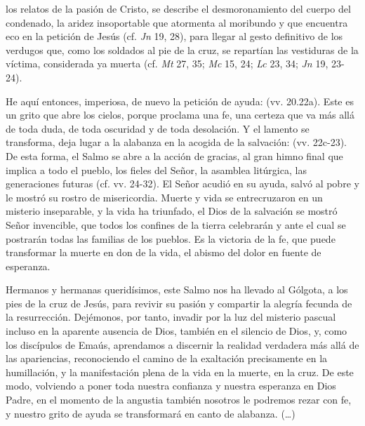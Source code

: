\begin{body}
los relatos de la pasión de Cristo, se describe el desmoronamiento del cuerpo del condenado, la aridez insoportable que atormenta al moribundo y que encuentra eco en la petición de Jesús  (cf. \emph{Jn} 19, 28), para llegar al gesto definitivo de los verdugos que, como los soldados al pie de la cruz, se repartían las vestiduras de la víctima, considerada ya muerta (cf. \emph{Mt} 27, 35; \emph{Mc} 15, 24; \emph{Lc} 23, 34; \emph{Jn} 19, 23-24). 

He aquí entonces, imperiosa, de nuevo la petición de ayuda:  (vv. 20.22a). Este es un grito que abre los cielos, porque proclama una fe, una certeza que va más allá de toda duda, de toda oscuridad y de toda desolación. Y el lamento se transforma, deja lugar a la alabanza en la acogida de la salvación:  (vv. 22c-23). De esta forma, el Salmo se abre a la acción de gracias, al gran himno final que implica a todo el pueblo, los fieles del Señor, la asamblea litúrgica, las generaciones futuras (cf. vv. 24-32). El Señor acudió en su ayuda, salvó al pobre y le mostró su rostro de misericordia. Muerte y vida se entrecruzaron en un misterio inseparable, y la vida ha triunfado, el Dios de la salvación se mostró Señor invencible, que todos los confines de la tierra celebrarán y ante el cual se postrarán todas las familias de los pueblos. Es la victoria de la fe, que puede transformar la muerte en don de la vida, el abismo del dolor en fuente de esperanza. 

Hermanos y hermanas queridísimos, este Salmo nos ha llevado al Gólgota, a los pies de la cruz de Jesús, para revivir su pasión y compartir la alegría fecunda de la resurrección. Dejémonos, por tanto, invadir por la luz del misterio pascual incluso en la aparente ausencia de Dios, también en el silencio de Dios, y, como los discípulos de Emaús, aprendamos a discernir la realidad verdadera más allá de las apariencias, reconociendo el camino de la exaltación precisamente en la humillación, y la manifestación plena de la vida en la muerte, en la cruz. De este modo, volviendo a poner toda nuestra confianza y nuestra esperanza en Dios Padre, en el momento de la angustia también nosotros le podremos rezar con fe, y nuestro grito de ayuda se transformará en canto de alabanza. (\ldots)
	
\end{body}

